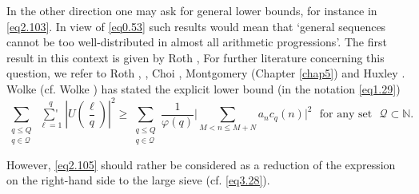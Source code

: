 In the other direction one may ask for general lower bounds, for
instance in \eqref{eq2.103}. In view of \eqref{eq0.53} such results would mean
that `general sequences cannot be too well-distributed in almost all
arithmetic progressions'. The first result\pageoriginale 
in this context is given by
Roth \cite{key1}, For further literature concerning this question, we refer
to Roth \cite{key3}, \cite{key5}, Choi \cite{key1}, Montgomery
\cite{key5} (Chapter \ref{chap5}) and 
Huxley \cite{key5}. Wolke \cite{key10} (cf. Wolke \cite{key9}) has
stated the explicit lower bound (in the notation \eqref{eq1.29}) 
\begin{equation*}
\sum_{\substack{q \leq Q\\ q \in
    \mathscr{Q}}}\mathop{\sum{}'}\limits_{\ell=1}^{q}|U(\frac{\ell}{q})|^2 
\geq \sum\limits_{\substack{q \leq Q \\ q \in \mathscr{Q}}}
\frac{1}{\varphi(q)} \bigg 
| \sum_{M < n \leq M+N} a_n c_q(n)\bigg |^2 \text{~ for any set~ } \mathscr{Q}
\subset \mathbb{N}. \tag{2.105}\label{eq2.105} 
\end{equation*}

However, \eqref{eq2.105} should rather be considered as a reduction of
the expression on the right-hand side to the large sieve
(cf. \eqref{eq3.28}). 
